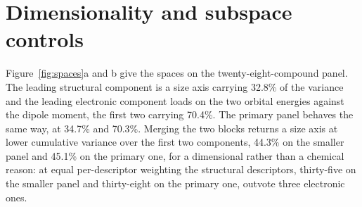 \documentclass[11pt,a4paper]{article}
\begin{document}
\section{Dimensionality and subspace controls}
\label{meth:dimdetail}

Figure~\ref{fig:spaces}a and b give the spaces on the twenty-eight-compound
panel. The leading structural component is a size axis carrying 32.8\% of the
variance and the leading electronic component loads on the two orbital energies
against the dipole moment, the first two carrying 70.4\%. The primary panel
behaves the same way, at 34.7\% and 70.3\%. Merging the two blocks returns a
size axis at lower cumulative variance over the first two components, 44.3\% on
the smaller panel and 45.1\% on the primary one, for a dimensional rather than a
chemical reason: at equal per-descriptor weighting the structural descriptors,
thirty-five on the smaller panel and thirty-eight on the primary one, outvote
three electronic ones.
\end{document}
